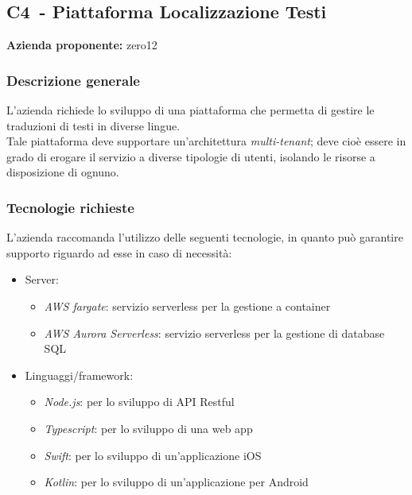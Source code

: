 
\renewcommand{\capName}{Piattaforma Localizzazione Testi} %
\renewcommand{\capCode}{C4} %
\renewcommand{\capLink}{https://www.math.unipd.it/~tullio/IS-1/2022/Progetto/C3.pdf} %
\renewcommand{\capProposer}{zero12} %


\subsection{\capCode\ - \capName}
\textbf{Azienda proponente:} zero12
\subsubsection{Descrizione generale}
L'azienda richiede lo sviluppo di una piattaforma che permetta di gestire le traduzioni di testi in diverse lingue. \\
Tale piattaforma deve supportare un'architettura \textit{multi-tenant}; deve cioè essere in grado di erogare il servizio a diverse tipologie di utenti, isolando le risorse a disposizione di ognuno.

\subsubsection{Tecnologie richieste}
L'azienda raccomanda l'utilizzo delle seguenti tecnologie, in quanto può garantire supporto riguardo ad esse in caso di necessità:
\begin{itemize}
    \item Server:
        \begin{itemize}
            \item \emph{AWS fargate}: servizio serverless per la gestione a container
            \item \emph{AWS Aurora Serverless}: servizio serverless per la gestione di database SQL
        \end{itemize}
    \item Linguaggi/framework:
        \begin{itemize}
            \item \emph{Node.js}: per lo sviluppo di API Restful
            \item \emph{Typescript}: per lo sviluppo di una web app
            \item \emph{Swift}: per lo sviluppo di un'applicazione iOS
            \item \emph{Kotlin}: per lo sviluppo di un'applicazione per Android
        \end{itemize}
\end{itemize}


